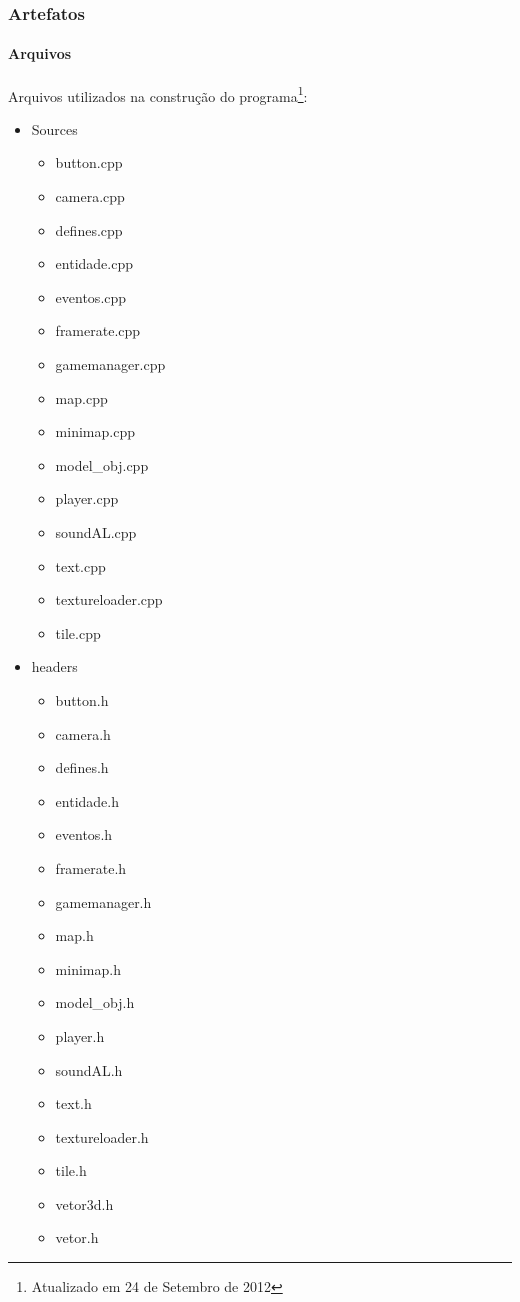 \subsubsection{Artefatos}\label{artefatos}

\paragraph{\textbf{Arquivos}}

Arquivos utilizados na construção do programa\footnote{Atualizado em 24 de Setembro de 2012}:\\

\begin{itemize}
	\item Sources
	\begin{itemize}
		\item button.cpp
		\item camera.cpp
		\item defines.cpp
		\item entidade.cpp
		\item eventos.cpp
		\item framerate.cpp
		\item gamemanager.cpp
		\item map.cpp
		\item minimap.cpp
		\item model\_obj.cpp
		\item player.cpp
		\item soundAL.cpp
		\item text.cpp
		\item textureloader.cpp
		\item tile.cpp
	\end{itemize}
	\item headers
	\begin{itemize}
		\item button.h
		\item camera.h  
		\item defines.h  
		\item entidade.h  
		\item eventos.h  
		\item framerate.h  
		\item gamemanager.h  
		\item map.h  
		\item minimap.h  
		\item model\_obj.h  
		\item player.h  
		\item soundAL.h  
		\item text.h  
		\item textureloader.h  
		\item tile.h  
		\item vetor3d.h  
		\item vetor.h
	\end{itemize}
\end{itemize}

